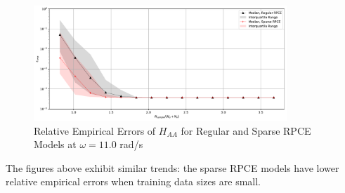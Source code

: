 \begin{figure}[H]
    \centering
    \includegraphics[width=0.85\textwidth]{
        plots/surrogate/plot_1_A_6.pdf
    }
    \caption{%
        Relative Empirical Errors of $H_{AA}$ for Regular and Sparse RPCE Models at $\omega=11.0$ rad/s
    }
    \label{FRF_sRPCE_A_A_6}
\end{figure}
The figures above exhibit similar trends: the sparse RPCE models have lower relative empirical errors when training data sizes are small.

